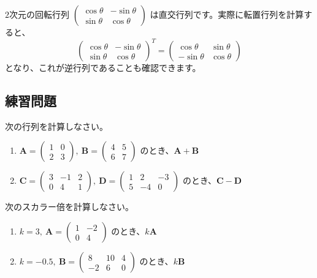 \begin{ex}
$2$次元の回転行列 $\begin{pmatrix} \cos\theta & -\sin\theta \\ \sin\theta & \cos\theta \end{pmatrix}$ は直交行列です。実際に転置行列を計算すると、
\[ \begin{pmatrix} \cos\theta & -\sin\theta \\ \sin\theta & \cos\theta \end{pmatrix}^T = \begin{pmatrix} \cos\theta & \sin\theta \\ -\sin\theta & \cos\theta \end{pmatrix} \]
となり、これが逆行列であることも確認できます。
\end{ex}

\subsection{練習問題}

\begin{quiz}
次の行列を計算しなさい。
\begin{enumerate}
\item $\bm{A} = \begin{pmatrix} 1 & 0 \\ 2 & 3 \end{pmatrix},\ \bm{B} = \begin{pmatrix} 4 & 5 \\ 6 & 7 \end{pmatrix}$ のとき、$\bm{A} + \bm{B}$
\item $\bm{C} = \begin{pmatrix} 3 & -1 & 2 \\ 0 & 4 & 1 \end{pmatrix},\ \bm{D} = \begin{pmatrix} 1 & 2 & -3 \\ 5 & -4 & 0 \end{pmatrix}$ のとき、$\bm{C} - \bm{D}$
\end{enumerate}
\end{quiz}

\begin{quiz}
次のスカラー倍を計算しなさい。
\begin{enumerate}
\item $k = 3,\ \bm{A} = \begin{pmatrix} 1 & -2 \\ 0 & 4 \end{pmatrix}$ のとき、$k\bm{A}$
\item $k = -0.5,\ \bm{B} = \begin{pmatrix} 8 & 10 & 4 \\ -2 & 6 & 0 \end{pmatrix}$ のとき、$k\bm{B}$
\end{enumerate}
\end{quiz}


